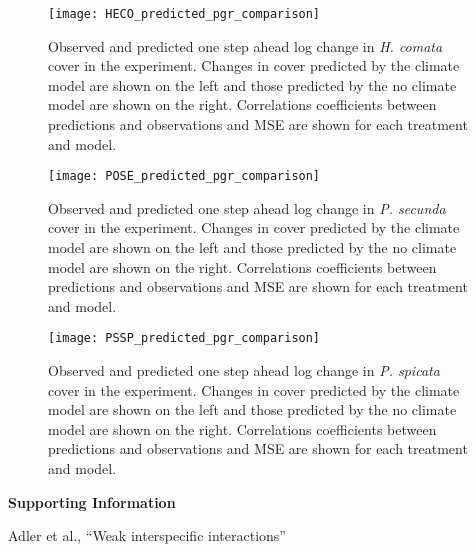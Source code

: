\documentclass[11pt]{article}
\begin{document}
\begin{figure}[!htbp]
	\centering
	\texttt{[image: HECO\_predicted\_pgr\_comparison]}
	\caption{Observed and predicted one step ahead log change in \textit{H. comata} cover in the experiment. Changes in cover predicted by the climate model are shown on the left and those predicted by the no climate model are shown on the right. Correlations coefficients between predictions and observations and MSE are shown for each treatment and model. }
	\label{fig:pgrHECO}
\end{figure}

\begin{figure}[!htbp]
	\centering
	\texttt{[image: POSE\_predicted\_pgr\_comparison]}
	\caption{Observed and predicted one step ahead log change in \textit{P. secunda} cover in the experiment. Changes in cover predicted by the climate model are shown on the left and those predicted by the no climate model are shown on the right. Correlations coefficients between predictions and observations and MSE are shown for each treatment and model.}
	\label{fig:pgrPOSE}
\end{figure}

\begin{figure}[!htbp]
	\centering
	\texttt{[image: PSSP\_predicted\_pgr\_comparison]}
	\caption{Observed and predicted one step ahead log change in \textit{P. spicata} cover in the experiment. Changes in cover predicted by the climate model are shown on the left and those predicted by the no climate model are shown on the right. Correlations coefficients between predictions and observations and MSE are shown for each treatment and model.}
	\label{fig:pgrPSSP}
\end{figure}




\clearpage 
\newpage 



\clearpage 
\newpage 

\setcounter{page}{1}
\setcounter{equation}{0}
\setcounter{figure}{0}
\setcounter{section}{0}
\setcounter{table}{0}
\renewcommand{\theequation}{SI.\arabic{equation}}
\renewcommand{\thetable}{SI-\arabic{table}}
\renewcommand{\thefigure}{SI-\arabic{figure}}
\renewcommand{\thesection}{Section SI.\arabic{section}}

\centerline{\Large \textbf{Supporting Information }}
\centerline{Adler et al., ``Weak interspecific interactions''} 
\end{document}
